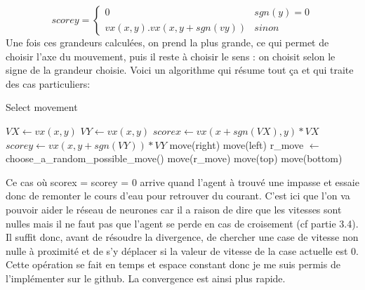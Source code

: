 \documentclass[10pt]{article}
\begin{document}
\[scorey = 
\begin{cases}
	0 & sgn(y) = 0 \\
	vx(x,y).vx(x,y+sgn(vy)) & sinon
\end{cases}
\]
Une fois ces grandeurs calculées, on prend la plus grande, ce qui permet de choisir l'axe du mouvement, puis il reste à choisir le sens : on choisit selon le signe de la grandeur choisie. Voici un algorithme qui résume tout ça et qui traite des cas particuliers:
\begin{algorithm}
\caption{Select movement}
\begin{algorithmic}
\STATE $VX \leftarrow vx(x,y)$
\STATE $VY \leftarrow vx(x,y)$
\STATE $scorex \leftarrow vx(x+sgn(VX),y)*VX$
\STATE $scorey \leftarrow vx(x,y+sgn(VY))*VY$
\STATE move(right)
\ELSE 
\STATE move(left)
\ENDIF
\ELSE
{}
\STATE r\_move $\leftarrow$ choose\_a\_random\_possible\_move()
\STATE move(r\_move)
\ELSE
{}
\STATE move(top)
\ELSE
\STATE move(bottom)
\ENDIF
\ENDIF
\ENDIF
\end{algorithmic}
\end{algorithm}

Ce cas où scorex = scorey = 0 arrive quand l'agent à trouvé une impasse et essaie donc de remonter le cours d'eau pour retrouver du courant. C'est ici que l'on va pouvoir aider le réseau de neurones car il a raison de dire que les vitesses sont nulles mais il ne faut pas que l'agent se perde en cas de croisement (cf partie 3.4). Il suffit donc, avant de résoudre la divergence, de chercher une case de vitesse non nulle à proximité et de s'y déplacer si la valeur de vitesse de la case actuelle est 0. Cette opération se fait en temps et espace constant donc je me suis permis de l'implémenter sur le github. La convergence est ainsi plus rapide.
\end{document}
